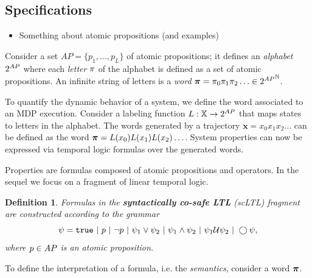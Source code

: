 \documentclass[conference]{IEEEtran}
\newtheorem{definition}{Definition}
\begin{document}
\subsection{Specifications}

\begin{itemize}
  \item Something about atomic propositions (and examples)
\end{itemize}

Consider a set $AP = \{ p_1, \ldots, p_L \}$ of atomic propositions; it defines an \emph{alphabet} ${2^{AP}}$ where each \emph{letter} $\pi$ of the alphabet is defined as a set of atomic propositions. An infinite string of letters is a \emph{word} $\boldsymbol{\pi}=\pi_0\pi_1\pi_2\ldots\in{2^{AP}}^{\mathbb{N}}$.

To quantify the dynamic behavior of a system, we define the word associated to an MDP execution. Consider a labeling function $L: \mathbb{X} \rightarrow {2^{AP}}$ that maps states to letters in the alphabet. The words generated by a trajectory $\mathbf{x} = x_0 x_1 x_2 \ldots$ can be defined as the word $\boldsymbol{\pi} = L(x_0)L(x_1) L(x_2) \ldots$. System properties can now be expressed via temporal logic formulas over the generated words.

Properties are formulas composed of atomic propositions and operators. In the sequel we focus on a fragment of linear temporal logic. 
\begin{definition}
  \label{def:gdtl-syntax}
  Formulas in the \textbf{syntactically co-safe LTL} (scLTL) fragment are constructed according to the grammar
  \begin{equation*}
    \label{eq:scLTL}
    \psi =  \True \ |\ p \ |\ \lnot p \ |\ \psi_1 \vee\psi_2  \ |\ \psi_1 \land \psi_2 \ |\ \psi_1 \ltluntil \psi_2 \ |\ \ltlnext \psi,
  \end{equation*}
  where $p\in AP$ is an atomic proposition.
\end{definition}

To define the interpretation of a formula, i.e. the \emph{semantics}, consider a word $\boldsymbol{\pi}$.
\end{document}
